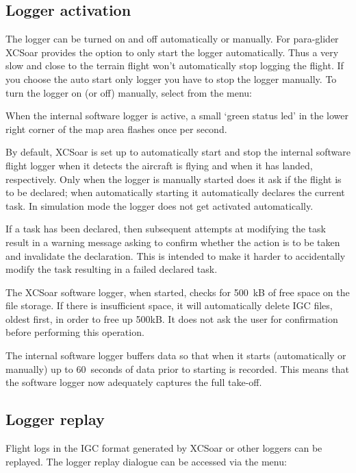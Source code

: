 \subsection*{Logger activation}
The logger can be turned on and off automatically or manually.  For para-glider
XCSoar provides the option to only start the logger automatically. Thus a very
slow and close to the terrain flight won't automatically stop logging the flight.
If you choose the auto start only logger you have to stop the logger manually.
To turn the logger on (or off) manually, select from the menu:
\begin{quote}
\blink{}
\end{quote}

When the internal software logger is active, a small `green status led' in the
lower right corner of the map area flashes once per second.

By default, XCSoar is set up to automatically start and stop the
internal software flight logger when it detects the aircraft is flying
and when it has landed, respectively.  Only when the logger is
manually started does it ask if the flight is to be declared; when
automatically starting it automatically declares the current task.
In simulation mode the logger does not get activated automatically.

If a task has been declared, then subsequent attempts at modifying the
task result in a warning message asking to confirm whether the action
is to be taken and invalidate the declaration.  This is intended to
make it harder to accidentally modify the task resulting in a failed
declared task.

The XCSoar software logger, when started, checks for 500~kB of free
space on the file storage.  If there is insufficient space, it will
automatically delete IGC files, oldest first, in order to free up
500kB.  It does not ask the user for confirmation before performing
this operation. \warning{}

The internal software logger buffers data so that when it starts
(automatically or manually) up to 60~seconds of data prior to starting
is recorded.  This means that the software logger now adequately
captures the full take-off.

\subsection*{Logger replay}\label{sec:logger-replay}
Flight logs in the IGC format generated by XCSoar or other loggers can
be replayed.  The logger replay dialogue can be accessed via the
menu:
\begin{quote}
\blink{}
\end{quote}

